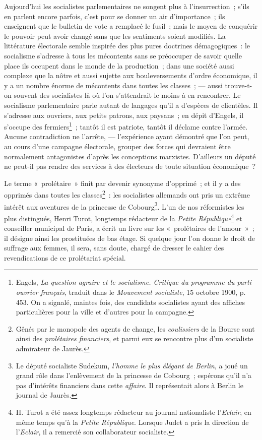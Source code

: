 \documentclass[french,twoside]{book} %
\begin{document}
Aujourd’hui les socialistes parlementaires ne songent plus à l’insurrection ; s’ils en parlent encore parfois, c’est pour se donner un air d’importance ; ils enseignent que le bulletin de vote a remplacé le fusil ; mais le moyen de conquérir le pouvoir peut avoir changé sans que les sentiments soient modifiés. La littérature électorale semble inspirée des plus pures doctrines démagogiques : le socialisme s’adresse à tous les mécontents sans se préoccuper de savoir quelle place ils occupent dans le monde de la production ; dans une société aussi complexe que la nôtre et aussi sujette aux bouleversements d’ordre économique, il y a un nombre énorme de mécontents dans toutes les classes ; — aussi trouve-t-on souvent des socialistes là où l’on s’attendrait le moins à en rencontrer. Le socialisme parlementaire parle autant de langages qu’il a d’espèces de clientèles. Il s’adresse aux ouvriers, aux petits patrons, aux paysans ; en dépit d’Engels, il s’occupe des fermiers\footnote{ \noindent Engels, \emph{La question agraire et le socialisme. Critique du programme du parti ouvrier français}, traduit dans le \emph{Mouvement socialiste}, 15 octobre 1900, p. 453. On a signalé, maintes fois, des candidats socialistes ayant des affiches particulières pour la ville et d’autres pour la campagne.
 } ; tantôt il est  patriote, tantôt il déclame contre l’armée. Aucune contradiction ne l’arrête, — l’expérience ayant démontré que l’on peut, au cours d’une campagne électorale, grouper des forces qui devraient être normalement antagonistes d’après les conceptions marxistes. D’ailleurs un député ne peut-il pas rendre des services à des électeurs de toute situation économique ?\par
Le terme « prolétaire » finit par devenir synonyme d’opprimé ; et il y a des opprimés dans toutes les classes\footnote{ \noindent Gênés par le monopole des agents de change, les \emph{coulissiers} de la Bourse sont ainsi des \emph{prolétaires financiers}, et parmi eux se rencontre plus d’un socialiste admirateur de Jaurès.
 } : les socialistes allemands ont pris un extrême intérêt aux aventures de la princesse de Cobourg\footnote{ \noindent Le député socialiste Sudekum, \emph{l’homme le plus élégant de Berlin}, a joué un grand rôle dans l’enlèvement de la princesse de Cobourg ; espérons qu’il n’a pas d’intérêts financiers dans cette \emph{affaire}. Il représentait alors à Berlin le journal de Jaurès.
 }. L’un de nos réformistes les plus distingués, Henri Turot, longtemps rédacteur de la \emph{Petite République}\footnote{ \noindent H. Turot a été assez longtemps rédacteur au journal nationaliste l’\emph{Eclair}, en même temps qu’à la \emph{Petite République}. Lorsque Judet a pris la direction de l’\emph{Eclair}, il a remercié son collaborateur socialiste.
 } et conseiller municipal de Paris, a écrit un livre sur les « prolétaires de l’amour » ; il désigne ainsi les prostituées de bas étage. Si quelque jour l’on donne le droit de suffrage  aux femmes, il sera, sans doute, chargé de dresser le cahier des revendications de ce prolétariat spécial.\par
\end{document}
